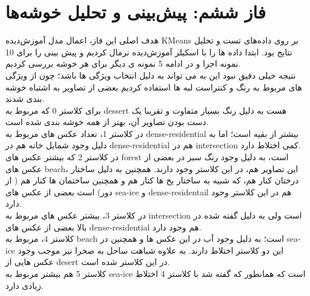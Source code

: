 \documentclass[a4paper,12pt]{article}
\let\nobreaksection\section
\renewcommand{\section}{\nobreaksection}
\begin{document}
	
	
	\section{فاز ششم: پیش‌بینی و تحلیل خوشه‌ها}
	
	هدف اصلی این فاز، اعمال مدل آموزش‌دیده KMeans بر روی داده‌های تست و تحلیل نتایج بود. 
ابتدا داده ها را با اسکیلر آموزش‌دیده نرمال کردیم و پیش بینی را برای 10 نمونه اجرا و در ادامه 5 نمونه ی دیگر برای هر خوشه بررسی کردیم.
\\
نتیجه خیلی دقیق نبود این به می تواند به دلیل انتخاب ویژگی ها باشد؛ چون از ویژگی های مربوط به رنگ و  کنتراست لبه ها استفاده کردیم بعضی از تصاویر به اشتباه خوشه بندی شدند.
\\
برای کلاستر 0 که مربوط به dessert هست به دلیل رنگ بسیار متفاوت و تقریبا یک دست بودن تصاویر آن، بهتر از همه خوشه بندی شده است.
\\
در کلاستر 1، تعداد عکس های مربوط به dense-residential بیشتر از بقیه است؛ اما به دلیل وجود شمایل خانه هم در dense-residential هم در intersection کمی اختلاط دارد.
\\
در کلاستر 2 که بیشتر عکس های forest است، به دلیل وجود رنگ سبز در بعضی از عکس های beach، این تصاویر هم، در این کلاستر وجود دارند. همچنین به دلیل ساختار درختان کنار هم، که شبیه به ساختار یخ ها کنار هم و همچنین ساختمان ها کنار هم ( از دور)   است بعضی از عکس های sea-ice و dense-residentail هم در این کلاستر وجود دارد.
\\
در کلاستر 3، بیشتر عکس های مربوط به intersection است ولی به دلیل گفته شده در بالا بعضی از عکس های dense-residential هم وجود دارد.
\\
کلاستر 4، مربوط به beach است؛ به دلیل وجود آب در این عکس ها و همچنین در sea-ice این دو کلاستر اختلاط دارند. به علاوه شباهت ساحل به صحرا نیز موجب وجود عکس هایی از  desert در این کلاستر شده است.
\\
کلاستر 5 هم بیشتر مربوط به sea-ice است که همانطور که گفته شد با کلاستر 4 اختلاط زیادی دارد.
\end{document}
